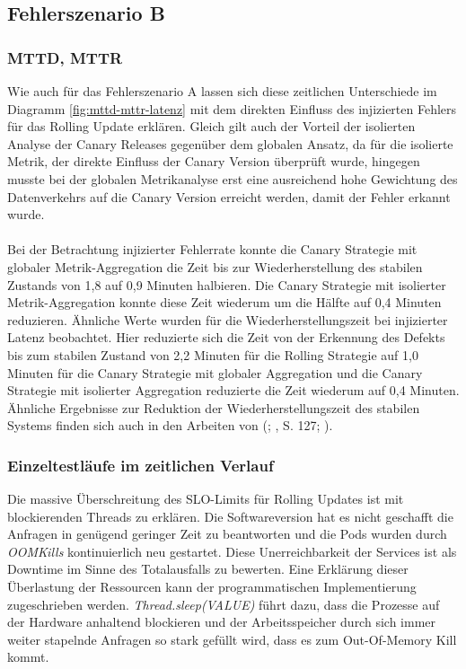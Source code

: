 \documentclass[
12pt,
a4paper,
twoside,
openright
]{report}
\begin{document}
	\subsection{Fehlerszenario B}
	\subsubsection{MTTD, MTTR}
	Wie auch für das Fehlerszenario A lassen sich diese zeitlichen Unterschiede im Diagramm \ref{fig:mttd-mttr-latenz} mit dem direkten Einfluss des injizierten Fehlers für das Rolling Update erklären. Gleich gilt auch der Vorteil der isolierten Analyse der Canary Releases gegenüber dem globalen Ansatz, da für die isolierte Metrik, der direkte Einfluss der Canary Version überprüft wurde, hingegen musste bei der globalen Metrikanalyse erst eine ausreichend hohe Gewichtung des Datenverkehrs auf die Canary Version erreicht werden, damit der Fehler erkannt wurde. 
	\\ \\
	Bei der Betrachtung injizierter Fehlerrate konnte die Canary Strategie mit globaler Metrik-Aggregation die Zeit bis zur Wiederherstellung des stabilen Zustands von 1,8 auf 0,9 Minuten halbieren. Die Canary Strategie mit isolierter Metrik-Aggregation konnte diese Zeit wiederum um die Hälfte auf 0,4 Minuten reduzieren. Ähnliche Werte wurden für die Wiederherstellungszeit bei injizierter Latenz beobachtet. Hier reduzierte sich die Zeit von der Erkennung des Defekts bis zum stabilen Zustand von 2,2 Minuten für die Rolling Strategie auf 1,0 Minuten für die Canary Strategie mit globaler Aggregation und die Canary Strategie mit isolierter Aggregation reduzierte die Zeit wiederum auf 0,4 Minuten. Ähnliche Ergebnisse zur Reduktion der Wiederherstellungszeit des stabilen Systems finden sich auch in den Arbeiten von (\parencite{william2025deployment};  \parencite{palvai2026designing}, S. 127; \parencite{mohammed2021enhancing}).
	
	\subsubsection{Einzeltestläufe im zeitlichen Verlauf}
	Die massive Überschreitung des SLO-Limits für Rolling Updates ist mit blockierenden Threads zu erklären. Die Softwareversion hat es nicht geschafft die Anfragen in genügend geringer Zeit zu beantworten und die Pods wurden durch \textit{OOMKills} kontinuierlich neu gestartet. Diese Unerreichbarkeit der Services ist als Downtime im Sinne des Totalausfalls zu bewerten. Eine Erklärung dieser Überlastung der Ressourcen kann der programmatischen Implementierung zugeschrieben werden. \textit{Thread.sleep(VALUE)} führt dazu, dass die Prozesse auf der Hardware anhaltend blockieren und der Arbeitsspeicher durch sich immer weiter stapelnde Anfragen so stark gefüllt wird, dass es zum Out-Of-Memory Kill kommt.
	
\end{document}
